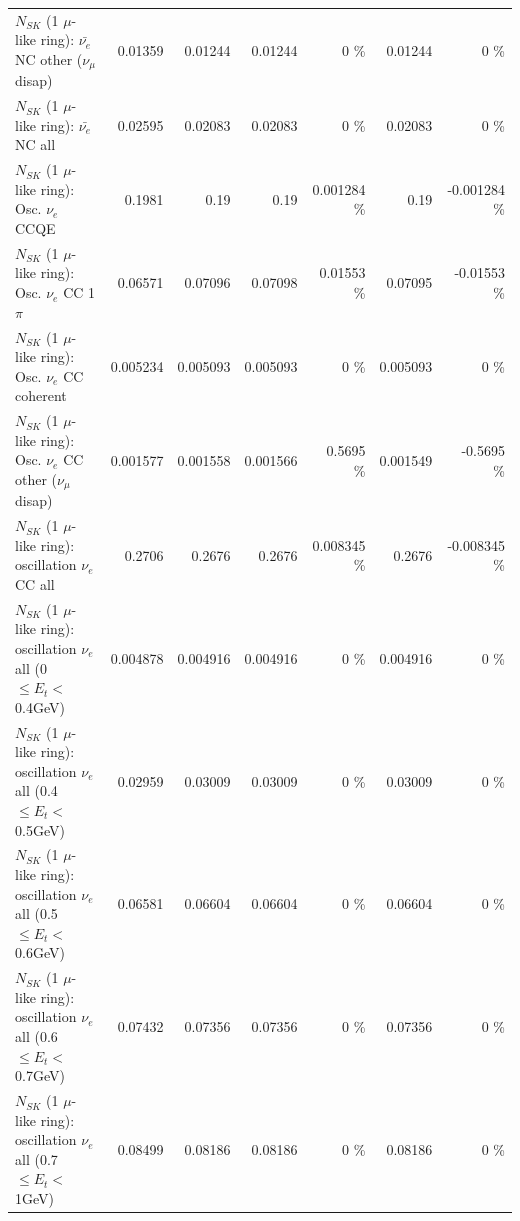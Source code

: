 \begin{table}
\begin{tabular}{| l | r | r | r  r | r  r |}
          $N_{SK}$ (1 $\mu$-like ring): $\bar{\nu_e}$ NC other ($\nu_\mu$ disap) &         0.01359 &         0.01244 &         0.01244 &        0 \%  &         0.01244 &        0 \%  \\ 
                            $N_{SK}$ (1 $\mu$-like ring): $\bar{\nu_{e}}$ NC all &         0.02595 &         0.02083 &         0.02083 &        0 \%  &         0.02083 &        0 \%  \\ 
\hline
\hline
\hline
                                 $N_{SK}$ (1 $\mu$-like ring): Osc. $\nu_e$ CCQE &          0.1981 &            0.19 &            0.19 & 0.001284 \%  &            0.19 & -0.001284 \%  \\ 
                            $N_{SK}$ (1 $\mu$-like ring): Osc. $\nu_e$ CC 1$\pi$ &         0.06571 &         0.07096 &         0.07098 &  0.01553 \%  &         0.07095 & -0.01553 \%  \\ 
                          $N_{SK}$ (1 $\mu$-like ring): Osc. $\nu_e$ CC coherent &        0.005234 &        0.005093 &        0.005093 &        0 \%  &        0.005093 &        0 \%  \\ 
           $N_{SK}$ (1 $\mu$-like ring): Osc. $\nu_e$ CC other ($\nu_\mu$ disap) &        0.001577 &        0.001558 &        0.001566 &   0.5695 \%  &        0.001549 &  -0.5695 \%  \\ 
                        $N_{SK}$ (1 $\mu$-like ring): oscillation $\nu_e$ CC all &          0.2706 &          0.2676 &          0.2676 & 0.008345 \%  &          0.2676 & -0.008345 \%  \\ 
\hline
$N_{SK}$ (1 $\mu$-like ring): oscillation $\nu_{e}$ all (0 $\leq E_{t} <$ 0.4GeV) &        0.004878 &        0.004916 &        0.004916 &        0 \%  &        0.004916 &        0 \%  \\ 
$N_{SK}$ (1 $\mu$-like ring): oscillation $\nu_{e}$ all (0.4 $\leq E_{t} <$ 0.5GeV) &         0.02959 &         0.03009 &         0.03009 &        0 \%  &         0.03009 &        0 \%  \\ 
$N_{SK}$ (1 $\mu$-like ring): oscillation $\nu_{e}$ all (0.5 $\leq E_{t} <$ 0.6GeV) &         0.06581 &         0.06604 &         0.06604 &        0 \%  &         0.06604 &        0 \%  \\ 
$N_{SK}$ (1 $\mu$-like ring): oscillation $\nu_{e}$ all (0.6 $\leq E_{t} <$ 0.7GeV) &         0.07432 &         0.07356 &         0.07356 &        0 \%  &         0.07356 &        0 \%  \\ 
$N_{SK}$ (1 $\mu$-like ring): oscillation $\nu_{e}$ all (0.7 $\leq E_{t} <$ 1GeV) &         0.08499 &         0.08186 &         0.08186 &        0 \%  &         0.08186 &        0 \%  \\ 

\end{tabular}
\end{table}
